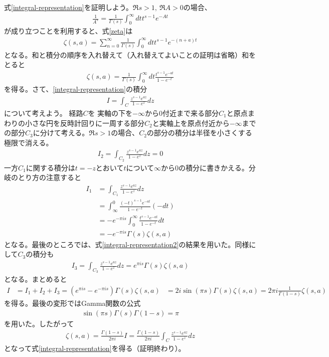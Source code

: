 \documentclass[pandoc,nomag,12pt,a4paper]{bxjsarticle}
\begin{document}
式\eqref{integral-representation}を証明しよう。$\Re s>1,\ \Re A >0$の場合、
\begin{align}
  \frac{1}{A^s}=\frac{1}{\Gamma(s)}\int_0^{\infty}dt t^{s-1} e^{-At}
\end{align}
が成り立つことを利用すると、式\eqref{zeta}は
\begin{align}
  \zeta(s,a)=\sum_{n=0}^{\infty}\frac{1}{\Gamma(s)}\int_0^{\infty}dt t^{s-1} e^{-(n+a)t}
\end{align}
となる。和と積分の順序を入れ替えて（入れ替えてよいことの証明は省略）和をとると
\begin{align}
  \zeta(s,a)=\frac{1}{\Gamma(s)}\int_0^{\infty}dt \frac{t^{s-1}e^{-at}}{1-e^{-t}}
  \label{integral-representation2}
\end{align}
を得る。さて、\eqref{integral-representation}の積分
\begin{align}
  I=\int_C \frac{z^{s-1}e^{az}}{1-e^{z}}dz
\end{align}
について考えよう。
経路$C$を
実軸の下を$-\infty$から$0$付近まで来る部分$C_1$と原点まわりの小さな円を反時計回りに一周する部分$C_2$と実軸上を原点付近から$-\infty$までの部分$C_3$に分けて考える。$\Re s>1$の場合、$C_2$の部分の積分は半径を小さくする極限で消える。
\begin{align}
  I_2=
  \int_{C_2}\frac{z^{s-1}e^{az}}{1-e^{z}}dz=0
\end{align}
一方$C_1$に関する積分は$t=-z$とおいて$t$について$\infty$から$0$の積分に書きかえる。分岐のとり方の注意すると
\begin{align}
  I_1&=\int_{C_1}\frac{z^{s-1}e^{az}}{1-e^{z}}dz\\
  &=\int_{\infty}^{0}\frac{(-t)^{s-1}e^{-at}}{1-e^{-t}}(-dt)\\
  &=-e^{-\pi i s}\int_{0}^{\infty}\frac{t^{s-1}e^{-at}}{1-e^{-t}}dt\\
  &=-e^{-\pi i s}\Gamma(s)\zeta(s,a)
\end{align}
となる。最後のところでは、式\eqref{integral-representation2}の結果を用いた。同様にして$C_3$の積分も
\begin{align}
  I_3=\int_{C_3}\frac{z^{s-1}e^{az}}{1-e^{z}}dz
  =e^{\pi i s}\Gamma(s)\zeta(s,a)
\end{align}
となる。まとめると
\begin{align}
  I&=I_1+I_2+I_3=
  (e^{\pi i s}-e^{-\pi i s})\Gamma(s)\zeta(s,a)
  &=2i\sin(\pi s) \Gamma(s)\zeta(s,a)
  =2\pi i \frac{1}{\Gamma(1-s)}\zeta(s,a)
\end{align}
を得る。最後の変形ではGamma関数の公式
\begin{align}
  \sin (\pi s) \Gamma(s)\Gamma(1-s)=\pi
\end{align}
を用いた。したがって
\begin{align}
  \zeta(s,a)
  =\frac{\Gamma(1-s)}{2\pi i} I
  =\frac{\Gamma(1-s)}{2\pi i} \int_C \frac{z^{s-1}e^{az}}{1-e^{z}}dz
\end{align}
となって式\eqref{integral-representation}を得る（証明終わり）。
\end{document}

